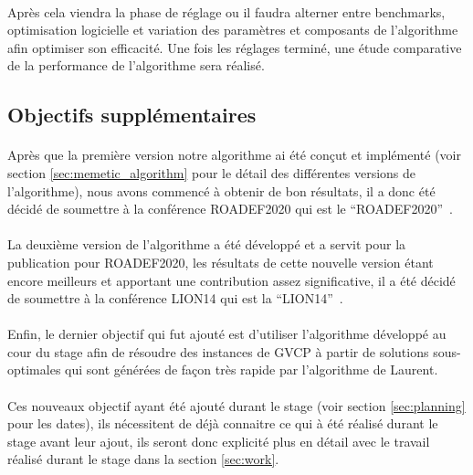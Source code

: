 \documentclass[a4paper,11pt,twoside,french,report]{../common/simplem}
\begin{document}
				\paragraph*{}
					Après cela viendra la phase de réglage ou il faudra alterner entre benchmarks, optimisation logicielle et variation des paramètres et composants de l'algorithme afin optimiser son efficacité. Une fois les réglages terminé, une étude comparative de la performance de l'algorithme sera réalisé.
			\subsection{Objectifs supplémentaires}
				\paragraph*{}
					Après que la première version notre algorithme ai été conçut et implémenté (voir section \ref{sec:memetic_algorithm} pour le détail des différentes versions de l'algorithme), nous avons commencé à obtenir de bon résultats, il a donc été décidé de soumettre à la conférence \acrshort{ROADEF2020} qui est le ``\acrlong{ROADEF2020}''~\cite{ROADEF2020}.
				\paragraph*{}
					La deuxième version de l'algorithme a été développé et a servit pour la publication pour \acrshort{ROADEF2020}, les résultats de cette nouvelle version étant encore meilleurs et apportant une contribution assez significative, il a été décidé de soumettre à la conférence \acrshort{LION14} qui est la ``\acrlong{LION14}''~\cite{LION14}.
				\paragraph*{}
					Enfin, le dernier objectif qui fut ajouté est d'utiliser l'algorithme développé au cour du stage afin de résoudre des instances de \gls{GVCP} à partir de solutions sous-optimales qui sont générées de façon très rapide par l'algorithme de Laurent.
				\paragraph*{}
					Ces nouveaux objectif ayant été ajouté durant le stage (voir section \ref{sec:planning} pour les dates), ils nécessitent de déjà connaitre ce qui à été réalisé durant le stage avant leur ajout, ils seront donc explicité plus en détail avec le travail réalisé durant le stage dans la section \ref{sec:work}.
\end{document}
